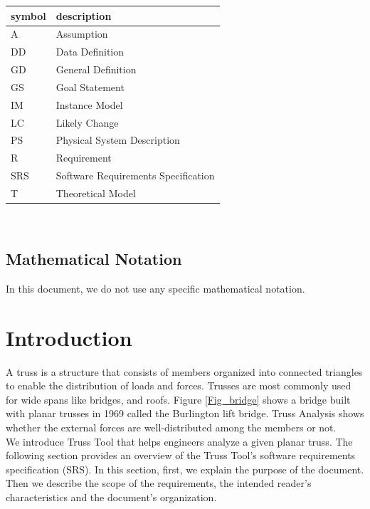 \documentclass[12pt]{article}
\begin{document}
\renewcommand{\arraystretch}{1.2}
\begin{tabular}{l l} 
  \toprule		
  \textbf{symbol} & \textbf{description}\\
  \midrule 
  A & Assumption\\
  DD & Data Definition\\
  GD & General Definition\\
  GS & Goal Statement\\
  IM & Instance Model\\
  LC & Likely Change\\
  PS & Physical System Description\\
  R & Requirement\\
  SRS & Software Requirements Specification\\
 
  T & Theoretical Model\\
  \bottomrule
\end{tabular}\\



\subsection{Mathematical Notation}
In this document, we do not use any specific mathematical notation.

\newpage


\section{Introduction}
{A truss is a structure that consists of members organized into connected triangles to enable the distribution of loads and forces. Trusses are most commonly used for wide spans like bridges, and roofs. Figure \ref{Fig_bridge} shows a bridge built with planar trusses in 1969 called the Burlington lift bridge. Truss Analysis shows whether the external forces are well-distributed among the members or not. \\
We introduce Truss Tool that helps engineers analyze a given planar truss. The following section provides an overview of the Truss Tool's software requirements specification (SRS). In this section, first, we explain the purpose of the document. Then we describe the scope of the requirements, the intended reader's characteristics and the document's organization.
}
\end{document}
